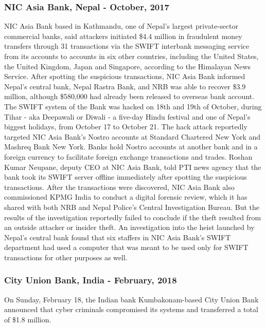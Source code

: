 \documentclass[12pt]{article}
\begin{document}
    \subsubsection{NIC Asia Bank, Nepal - October, 2017}
        NIC Asia Bank based in Kathmandu, one of Nepal's largest private-sector commercial banks, said attackers initiated \$4.4 million in fraudulent money transfers through 31 transactions \cite{NICreport} via the SWIFT interbank messaging service from its accounts to accounts in six other countries, including the United States, the United Kingdom, Japan and Singapore, according to the Himalayan News Service. 
        After spotting the suspicious transactions, NIC Asia Bank informed Nepal's central bank, Nepal Rastra Bank, and NRB was able to recover \$3.9 million, although \$580,000 had already been released to overseas bank account.
        The SWIFT system of the Bank was hacked on 18th and 19th of October, during Tihar - aka Deepawali or Diwali - a five-day Hindu festival and one of Nepal's biggest holidays, from October 17 to October 21.
        The hack attack reportedly targeted NIC Asia Bank's Nostro accounts at Standard Chartered New York and Mashreq Bank New York. Banks hold Nostro accounts at another bank and in a foreign currency to facilitate foreign exchange transactions and trades.
        Roshan Kumar Neupane, deputy CEO at NIC Asia Bank, told PTI news agency that the bank took its SWIFT server offline immediately after spotting the suspicious transactions. After the transactions were discovered, NIC Asia Bank also commissioned KPMG India to conduct a digital forensic review, which it has shared with both NRB and Nepal Police's Central Investigation Bureau. But the results of the investigation reportedly failed to conclude if the theft resulted from an outside attacker or insider theft.
        An investigation into the heist launched by Nepal's central bank found that six staffers in NIC Asia Bank's SWIFT department had used a computer that was meant to be used only for SWIFT transactions for other purposes as well.\cite{ReportAttackersHacked}\cite{NICAsiaBank2017}
        
        
    \subsubsection{City Union Bank, India -  February, 2018}
        
        On Sunday, February 18, the Indian bank Kumbakonam-based City Union Bank announced that cyber criminals compromised its systems and transferred a total of \$1.8 million.  
        
\end{document}
